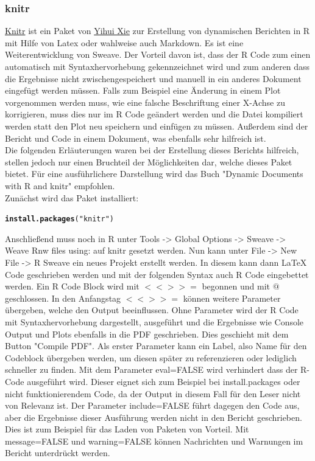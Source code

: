 \documentclass{article}\usepackage[]{graphicx}\usepackage[]{color}
\makeatletter
\newcommand{\hlstr}[1]{\textcolor[rgb]{0.192,0.494,0.8}{#1}}%
\newcommand{\hlstd}[1]{\textcolor[rgb]{0.345,0.345,0.345}{#1}}%
\newcommand{\hlkwd}[1]{\textcolor[rgb]{0.737,0.353,0.396}{\textbf{#1}}}%
\newenvironment{kframe}{%
 \def\at@end@of@kframe{}%
 \ifinner\ifhmode%
  \def\at@end@of@kframe{\end{minipage}}%
  \begin{minipage}{\columnwidth}%
 \fi\fi%
 \def\FrameCommand##1{\hskip\@totalleftmargin \hskip-\fboxsep
 \colorbox{shadecolor}{##1}\hskip-\fboxsep
     \hskip-\linewidth \hskip-\@totalleftmargin \hskip\columnwidth}%
 \MakeFramed {\advance\hsize-\width
   \@totalleftmargin\z@ \linewidth\hsize
   \@setminipage}}%
 {\par\unskip\endMakeFramed%
 \at@end@of@kframe}
\newenvironment{knitrout}{}{} %
\makeatother
\begin{document}
\subsubsection{knitr}
\href{http://cran.r-project.org/web/packages/knitr/index.html}{Knitr} ist ein Paket von \href{http://yihui.name/knitr/}{Yihui Xie} zur Erstellung von dynamischen Berichten in R mit Hilfe von Latex oder wahlweise auch Markdown. Es ist eine Weiterentwicklung von Sweave.\cite{lmucs-papers:Leisch:2002} Der Vorteil davon ist, dass der R Code zum einen automatisch mit Syntaxhervorhebung gekennzeichnet wird und zum anderen dass die Ergebnisse nicht zwischengespeichert und manuell in ein anderes Dokument eingefügt werden müssen. Falls zum Beispiel eine Änderung in einem Plot vorgenommen werden muss, wie eine falsche Beschriftung einer X-Achse zu korrigieren, muss dies nur im R Code geändert werden und die Datei kompiliert werden statt den Plot neu speichern und einfügen zu müssen. Außerdem sind der Bericht und Code in einem Dokument, was ebenfalls sehr hilfreich ist.\\
Die folgenden Erläuterungen waren bei der Erstellung dieses Berichts hilfreich, stellen jedoch nur einen Bruchteil der Möglichkeiten dar, welche dieses Paket bietet. Für eine ausführlichere Darstellung wird das Buch "Dynamic Documents with R and knitr" empfohlen.\cite{xie2013dynamic}\\
Zunächst wird das Paket installiert:
\begin{knitrout}
\color{fgcolor}\begin{kframe}
\begin{alltt}
\hlkwd{install.packages}\hlstd{(}\hlstr{"knitr"}\hlstd{)}
\end{alltt}
\end{kframe}
\end{knitrout}
Anschließend muss noch in R unter Tools -> Global Options -> Sweave -> Weave Rnw files using: auf knitr gesetzt werden. Nun kann unter File -> New File -> R Sweave ein neues Projekt erstellt werden. In diesem kann dann LaTeX Code geschrieben werden und mit der folgenden Syntax auch R Code eingebettet werden. Ein R Code Block wird mit $<<>>=$ begonnen und mit $@$ geschlossen. In den Anfangstag $<<>>=$ können weitere Parameter übergeben, welche den Output beeinflussen. Ohne Parameter wird der R Code mit Syntaxhervorhebung dargestellt, ausgeführt und die Ergebnisse wie Console Output und Plots ebenfalls in die PDF geschrieben. Dies geschieht mit dem Button "Compile PDF". Als erster Parameter kann ein Label, also Name für den Codeblock übergeben werden, um diesen später zu referenzieren oder lediglich schneller zu finden. Mit dem Parameter eval=FALSE wird verhindert dass der R-Code ausgeführt wird. Dieser eignet sich zum Beispiel bei install.packages oder nicht funktionierendem Code, da der Output in diesem Fall für den Leser nicht von Relevanz ist. Der Parameter include=FALSE führt dagegen den Code aus, aber die Ergebnisse dieser Ausführung werden nicht in den Bericht geschrieben. Dies ist zum Beispiel für das Laden von Paketen von Vorteil. Mit message=FALSE und warning=FALSE können Nachrichten und Warnungen im Bericht unterdrückt werden.
\end{document}
